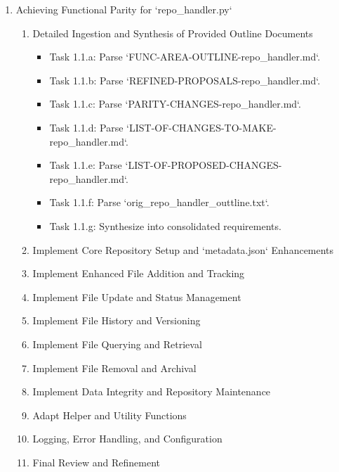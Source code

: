 \documentclass{article}
\begin{document}
\begin{enumerate}[label=\textbf{Phase \arabic*:}, wide, labelwidth=!, labelindent=0pt]
    \item Achieving Functional Parity for `repo_handler.py`
    \begin{enumerate}[label=\textbf{Task 1.\arabic*:}, wide, labelwidth=!, labelindent=0pt, leftmargin=*]
        \item Detailed Ingestion and Synthesis of Provided Outline Documents
            \begin{itemize}
                \item[\textbullet] Task 1.1.a: Parse `FUNC-AREA-OUTLINE-repo_handler.md`.
                \item[\textbullet] Task 1.1.b: Parse `REFINED-PROPOSALS-repo_handler.md`.
                \item[\textbullet] Task 1.1.c: Parse `PARITY-CHANGES-repo_handler.md`.
                \item[\textbullet] Task 1.1.d: Parse `LIST-OF-CHANGES-TO-MAKE-repo_handler.md`.
                \item[\textbullet] Task 1.1.e: Parse `LIST-OF-PROPOSED-CHANGES-repo_handler.md`.
                \item[\textbullet] Task 1.1.f: Parse `orig_repo_handler_outtline.txt`.
                \item[\textbullet] Task 1.1.g: Synthesize into consolidated requirements.
            \end{itemize}
        \item Implement Core Repository Setup and `metadata.json` Enhancements
        \item Implement Enhanced File Addition and Tracking
        \item Implement File Update and Status Management
        \item Implement File History and Versioning
        \item Implement File Querying and Retrieval
        \item Implement File Removal and Archival
        \item Implement Data Integrity and Repository Maintenance
        \item Adapt Helper and Utility Functions
        \item Logging, Error Handling, and Configuration
        \item Final Review and Refinement
    \end{enumerate}
\end{enumerate}
\end{document}
